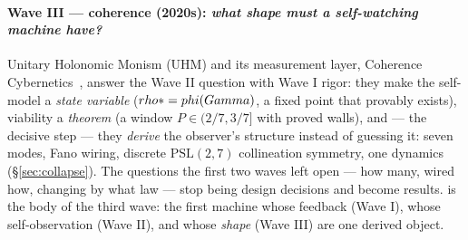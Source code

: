 \paragraph{Wave III --- coherence (2020s): \emph{what shape must a
self-watching machine have?}} Unitary Holonomic Monism (UHM) and its
measurement layer, Coherence Cybernetics~\cite{uhm2026}, answer the Wave II
question with Wave I rigor: they make the self-model a \emph{state variable}
($rho*=phi(Gamma)$, a fixed point that provably exists), viability a
\emph{theorem} (a window $P\in(2/7,3/7]$ with proved walls), and --- the
decisive step --- they \emph{derive} the observer's structure instead of
guessing it: seven modes, Fano wiring, discrete $\mathrm{PSL}(2,7)$ collineation
symmetry, one dynamics
(\S\ref{sec:collapse}). The questions the first two waves left open ---
how many, wired how, changing by what law --- stop being design decisions and
become results. \TALOS{} is the body of the third wave: the first machine
whose feedback (Wave I), whose self-observation (Wave II), and whose
\emph{shape} (Wave III) are one derived object.

